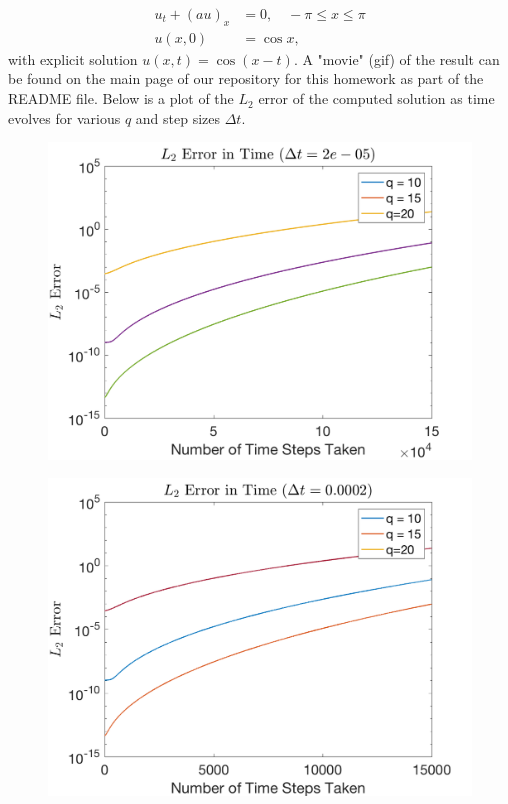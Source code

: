 \documentclass{article}
\begin{document}
	\begin{align*}
		u_t + \left( a u\right)_x & = 0, \quad -\pi \leq x \leq \pi \\
		u(x,0) & = \cos x,
	\end{align*}
with explicit solution $u(x,t) = \cos (x - t)$. A "movie" (gif) of the result can be found on the main page of our repository for this homework as part of the README file. Below is a plot of the $L_2$ error of the computed solution as time evolves for various $q$ and step sizes $\Delta t$.

\begin{figure}[H]
  \centering
  \begin{minipage}{.4\textwidth}
    \centering
    \includegraphics[width=\linewidth]{plots/l2_time_1.png}
    \label{fig:smallstep}
  \end{minipage}%
  \begin{minipage}{.4\textwidth}
    \centering
    \includegraphics[width=\linewidth]{plots/l2_time_2.png}

\end{minipage}
\end{figure}
\end{document}
